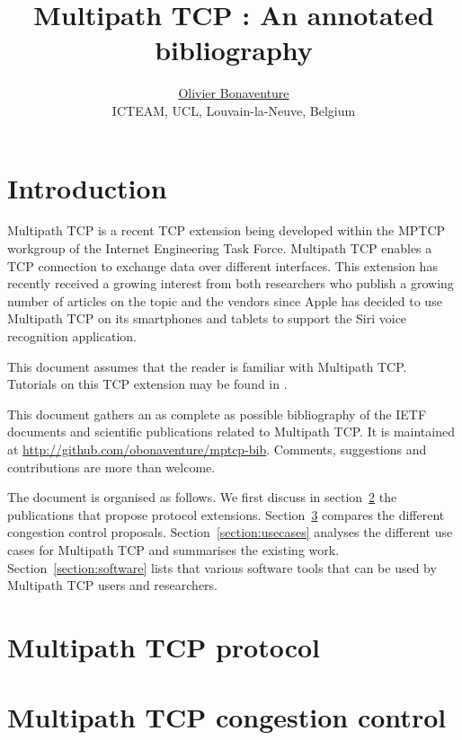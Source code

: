 \documentclass{article}
\title{Multipath TCP : An annotated bibliography}
\author{\href{http://perso.uclouvain.be/olivier.bonaventure}{Olivier Bonaventure}\\
\small{ICTEAM, UCL, Louvain-la-Neuve, Belgium}
}
\newcommand{\biburl}{\url{http://github.com/obonaventure/mptcp-bib}}
\begin{document}
\maketitle 



\section{Introduction}

Multipath TCP\cite{rfc6824} is a recent TCP extension being developed within the MPTCP workgroup of the Internet Engineering Task Force. Multipath TCP enables a TCP connection to exchange data over different interfaces. This extension has recently received a growing interest from both researchers who publish a growing number of articles on the topic and the vendors since Apple has decided to use Multipath TCP on its smartphones and tablets to support the Siri voice recognition application. 

This document assumes that the reader is familiar with Multipath TCP. Tutorials on this TCP extension may be found in \cite{Paasch_MPTCP:2014,Raiciu_ebook:2013,Bonaventure_Overview:2012}.

This document gathers an as complete as possible bibliography of the IETF documents and scientific publications related to Multipath TCP. It is maintained at \biburl. Comments, suggestions and contributions are more than welcome. 

The document is organised as follows. We first discuss in section~\ref{section:protocol} the publications that propose protocol extensions. Section~\ref{section:congestion} compares the different congestion control proposals. Section~\ref{section:usecases} analyses the different use cases for Multipath TCP and summarises the existing work. Section~\ref{section:software} lists that various software tools that can be used by Multipath TCP users and researchers.


\section{Multipath TCP protocol}\label{section:protocol}




\section{Multipath TCP congestion control}\label{section:congestion}
\end{document}
